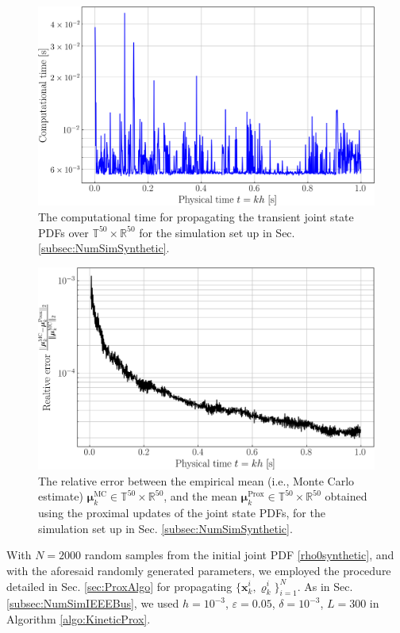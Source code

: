\documentclass[10pt,twocolumn]{IEEEtran}
\begin{document}
\begin{figure}[t]
\centering
\includegraphics[width=0.85\linewidth]{ComputationalTimeSynthetic50Gen.png}
\caption{\small{The computational time for propagating the transient joint state PDFs over $\mathbb{T}^{50}\times\mathbb{R}^{50}$ for the simulation set up in Sec. \ref{subsec:NumSimSynthetic}.}}
\vspace*{-0.2in}
\label{fig:CompTimeSynthetic}
\end{figure}
\begin{figure}[t]
\centering
\includegraphics[width=0.85\linewidth]{RelativeErrorMeanMCVersusProxSynthetic50Gen.png}
\caption{\small{The relative error between the empirical mean (i.e., Monte Carlo estimate) $\bm{\mu}_{k}^{\text{MC}}\in\mathbb{T}^{50}\times\mathbb{R}^{50}$, and the mean $\bm{\mu}_{k}^{\text{Prox}}\in\mathbb{T}^{50}\times\mathbb{R}^{50}$ obtained using the proximal updates of the joint state PDFs, for the simulation set up in Sec. \ref{subsec:NumSimSynthetic}.}}
\vspace*{-0.2in}
\label{fig:RelErrSynthetic}
\end{figure}

With $N=2000$ random samples from the initial joint PDF \eqref{rho0synthetic}, and with the aforesaid randomly generated parameters, we employed the procedure detailed in Sec. \ref{sec:ProxAlgo} for propagating $\{\bm{x}_{k}^{i},\varrho_{k}^{i}\}_{i=1}^{N}$. As in Sec. \ref{subsec:NumSimIEEEBus}, we used $h=10^{-3}$, $\varepsilon = 0.05$, $\delta = 10^{-3}$, $L = 300$ in Algorithm \ref{algo:KineticProx}.
\end{document}
